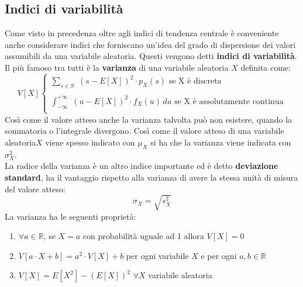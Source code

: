 \documentclass[a4paper,12pt, oneside]{book}
\begin{document}
\subsection{Indici di variabilità}
Come visto in precedenza oltre agli indici di tendenza centrale è conveniente anche considerare indici che forniscano un'idea del grado di dispersione
dei valori assumibili da una variabile aleatoria.
Questi vengono detti \textbf{indici di variabilità}. Il più famoso tra tutti è la \textbf{varianza} di una variabile aleatoria $X$ definita come:
\[V[X]\begin{cases}
\sum_{s\in S}\,\, (s-E[X])^2\cdot p_X(s)\mbox{ se X è discreta}\\
\\
\int_{-\infty}^{+\infty}\,\, (u-E[X])^2\cdot f_X(u)\,du\mbox{ se X è assolutamente continua}\\
\end{cases}\]
Così come il valore atteso anche la varianza talvolta può non esistere, quando la
sommatoria o l'integrale divergono.
Così come il valore atteso di una variabile aleatoria$ X$ viene spesso indicato con $\mu_X$ si ha che la varianza viene indicata con $\sigma_X^2$.\\
La radice della varianza è un altro indice importante ed è detto \textbf{deviazione standard}, ha il vantaggio rispetto alla varianza di avere la stessa unità di misura del valore atteso:
\[\sigma_X=\sqrt{s_X^2}\]
La varianza ha le seguenti proprietà:
\begin{enumerate}
\item $\forall a\in\mathbb{R}$, se $X=a$ con probabilità uguale ad 1 allora $V[X]=0$
\item $V[a\cdot X+b]=a^2\cdot V[X]+b$ per ogni variabile $X$ e per ogni $a,b \in\mathbb{R}$
\item $V[X]=E[X^2]-(E[X])^2\,\,\forall X$ variabile aleatoria
\end{enumerate}
\end{document}

